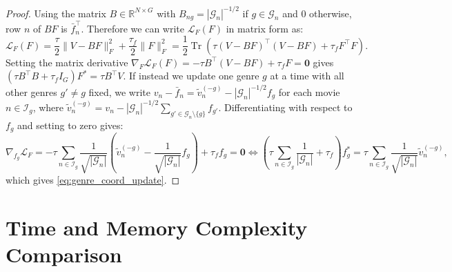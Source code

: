 \documentclass{article}
\theoremstyle{plain}
\theoremstyle{definition}
\begin{document}
\begin{proof}
Using the matrix $B \in \mathbb{R}^{N \times G}$ with $B_{ng} = |\mathcal{G}_n|^{-1/2}$ if $g \in \mathcal{G}_n$ and $0$ otherwise, row $n$ of $BF$ is $\bar{f}_n^\top$. Therefore we can write $\mathcal{L}_F(F)$ in matrix form as:
\begin{equation}
\mathcal{L}_F(F) = \frac{\tau}{2} \|V - B F\|_F^2 + \frac{\tau_f}{2} \|F\|_F^2 = \frac{1}{2} \operatorname{Tr}\!\left( \tau (V - BF)^\top (V - BF) + \tau_f F^\top F \right).
\end{equation}
Setting the matrix derivative $\nabla_F \mathcal{L}_F(F) = -\tau B^\top (V - BF) + \tau_f F = \mathbf{0}$ gives $(\tau B^\top B + \tau_f I_G) F^* = \tau B^\top V$. If instead we update one genre $g$ at a time with all other genres $g' \neq g$ fixed, we write $v_n - \bar{f}_n = \tilde{v}_n^{(-g)} - |\mathcal{G}_n|^{-1/2} f_g$ for each movie $n \in \mathcal{I}_g$, where $\tilde{v}_n^{(-g)} = v_n - |\mathcal{G}_n|^{-1/2} \sum_{g' \in \mathcal{G}_n \setminus \{g\}} f_{g'}$. Differentiating with respect to $f_g$ and setting to zero gives:
\begin{equation}
\nabla_{f_g} \mathcal{L}_F = -\tau \sum_{n \in \mathcal{I}_g} \frac{1}{\sqrt{|\mathcal{G}_n|}} \left( \tilde{v}_n^{(-g)} - \frac{1}{\sqrt{|\mathcal{G}_n|}} f_g \right) + \tau_f f_g = \mathbf{0} \iff \left( \tau \sum_{n \in \mathcal{I}_g} \frac{1}{|\mathcal{G}_n|} + \tau_f \right) f_g^* = \tau \sum_{n \in \mathcal{I}_g} \frac{1}{\sqrt{|\mathcal{G}_n|}} \tilde{v}_n^{(-g)},
\end{equation}
which gives \cref{eq:genre_coord_update}.
\end{proof}

\section{Time and Memory Complexity Comparison}
\label{app:complexity}
\end{document}
